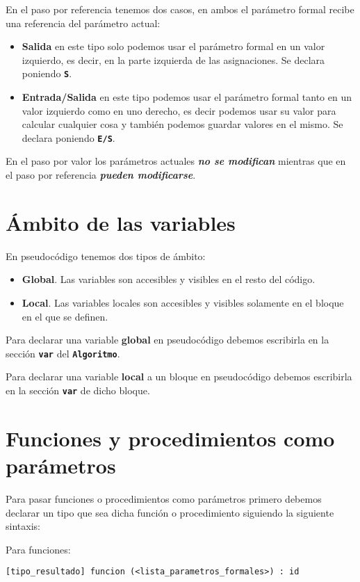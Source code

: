 \documentclass{article}
\newcommand{\pkeyword}[1]{\textcolor{azulpseudo}{\texttt{\textbf{#1}}}}
\begin{document}
En el paso por referencia tenemos dos casos, en ambos el parámetro formal recibe una referencia del parámetro actual:
\begin{itemize}
\item \textbf{Salida} en este tipo solo podemos usar el parámetro formal en un valor izquierdo, es decir, en la parte izquierda de las asignaciones. Se declara poniendo \pkeyword{S}.
\item \textbf{Entrada/Salida} en este tipo podemos usar el parámetro formal tanto en un valor izquierdo como en uno derecho, es decir podemos usar su valor para calcular cualquier cosa y también podemos guardar valores en el mismo. Se declara poniendo \pkeyword{E/S}.
\end{itemize}

En el paso por valor los parámetros actuales \textbf{\textit{no se modifican}} mientras que en el paso por referencia \textbf{\textit{pueden modificarse}}.

\section{Ámbito de las variables}
En pseudocódigo tenemos dos tipos de ámbito:
\begin{itemize}
\item \textbf{Global}. Las variables son accesibles y visibles en el resto del código.
\item \textbf{Local}. Las variables locales son accesibles y visibles solamente en el bloque en el que se definen.
\end{itemize}

Para declarar una variable \textbf{global} en pseudocódigo debemos escribirla en la sección \pkeyword{var} del \pkeyword{Algoritmo}.

Para declarar una variable \textbf{local} a un bloque en pseudocódigo debemos escribirla en la sección \pkeyword{var} de dicho bloque.

\section{Funciones y procedimientos como parámetros}
Para pasar funciones o procedimientos como parámetros primero debemos declarar un tipo que sea dicha función o procedimiento siguiendo la siguiente sintaxis:

Para funciones:
\begin{lstlisting}[language = pseudocodigoesp]
[tipo_resultado] funcion (<lista_parametros_formales>) : id
\end{lstlisting}
\end{document}
